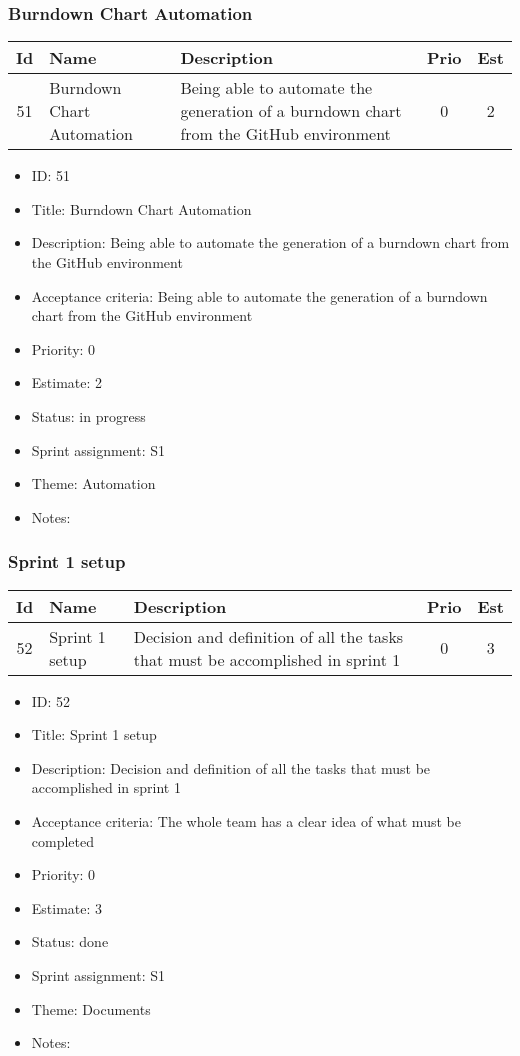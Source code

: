 \newpage
\subsubsection{Burndown Chart Automation}
\begin{tabular}{|c|m{1.5cm}|m{4cm}|c|c|}
	\hline
	\textbf{Id}&\textbf{Name}&\textbf{Description}&\textbf{Prio}&\textbf{Est}\\
	\hline
	51 & Burndown Chart Automation & 
	Being able to automate the generation of a burndown chart from the GitHub environment &
	0 & 2 \\
	\hline
\end{tabular}
\begin{itemize}
	\item ID: 51
	\item Title: Burndown Chart Automation
	\item Description: Being able to automate the generation of a burndown chart from the GitHub environment
	\item Acceptance criteria: Being able to automate the generation of a burndown chart from the GitHub environment
	\item Priority: 0
	\item Estimate: 2
	\item Status: in progress
	\item Sprint assignment: S1
	\item Theme: Automation
	\item Notes:
\end{itemize}

\newpage
\subsubsection{Sprint 1 setup}
\begin{tabular}{|c|m{1.5cm}|m{4cm}|c|c|}
	\hline
	\textbf{Id}&\textbf{Name}&\textbf{Description}&\textbf{Prio}&\textbf{Est}\\
	\hline
	52 & Sprint 1 setup & 
	Decision and definition of all the tasks that must be accomplished in sprint 1 &
	0 & 3 \\
	\hline
\end{tabular}
\begin{itemize}
	\item ID: 52
	\item Title: Sprint 1 setup
	\item Description: Decision and definition of all the tasks that must be accomplished in sprint 1
	\item Acceptance criteria: The whole team has a clear idea of what must be completed 
	\item Priority: 0
	\item Estimate: 3
	\item Status: done
	\item Sprint assignment: S1
	\item Theme: Documents
	\item Notes:
\end{itemize}

